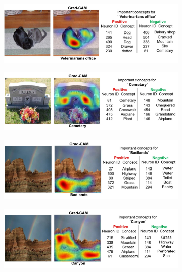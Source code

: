 \begin{figure}[h]
\begin{center}
\begin{subfigure}[t]{\columnwidth}
\vspace{10pt}
\end{subfigure}
\begin{subfigure}[t]{\columnwidth}
\includegraphics[scale=0.135]{figures/9_pos.jpg}\caption{}
\vspace{10pt}
\end{subfigure}
\begin{subfigure}[t]{\columnwidth}
\includegraphics[scale=0.135]{figures/10_pos.jpg}\caption{}
\vspace{10pt}
\end{subfigure}
\begin{subfigure}[t]{\columnwidth}
\includegraphics[scale=0.135]{figures/3_neg.jpg}\caption{}
\vspace{10pt}
\end{subfigure}
\begin{subfigure}[t]{\columnwidth}
\includegraphics[scale=0.135]{figures/4_neg.jpg}\caption{}

\end{subfigure}
\end{center}
\end{figure}
